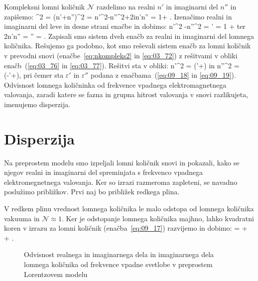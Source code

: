 Kompleksni lomni količnik $\mathcal{N}$ razdelimo na realni $n'$ in imaginarni del $n''$ in 
zapišemo:
\beq
{}^2 = (n'+n'')^2 = n'^2-n''^2+2in'n'' =  1+ .
\label{eq:09_17}
\eeq
Izenačimo realni in imaginarni del leve in desne strani enačbe in dobimo:
\beq
n'^2 -n''^2 = \varepsilon' = 1 + 
\label{eq:09_18}
\eeq
ter 
\beq
2n'n'' = \varepsilon'' = .
\label{eq:09_19}
\eeq
Zapisali smo sistem dveh enačb za realni in imaginarni del lomnega količnika. Rešujemo ga podobno, kot
smo reševali sistem enačb za lomni količnik v prevodni snovi (enačbe~\ref{eq:nkompleks2} in \ref{eq:03_72})
z rešitvami v obliki enačb~(\ref{eq:03_76} in \ref{eq:03_77}). Rešitvi sta v obliki:
\beq
n'^2 = \left(\varepsilon'+\right)
\label{eq:09_20}
\eeq
in
\beq
n''^2 = \left(-\varepsilon'+\right)\!,
\label{eq:09_21}
\eeq
pri čemer sta $\varepsilon'$ in $\varepsilon''$ podana z enačbama~(\ref{eq:09_18} in \ref{eq:09_19}).
Odvisnost lomnega količninka od frekvence vpadnega elektromagnetnega valovanja, zaradi katere
se fazna in grupna hitrost valovanja v snovi razlikujeta, imenujemo disperzija.

\section{Disperzija}
Na preprostem modelu smo izpeljali lomni količnik snovi in pokazali,
kako se njegov realni in imaginarni del
spreminjata s frekvenco vpadnega elektromegnetnega valovanja. Ker so izrazi
razmeroma zapleteni, se navadno poslužimo približkov. Prvi naj 
bo približek redkega plina. 

V redkem plinu vrednost lomnega količnika le malo odstopa od lomnega količnika vakuuma 
in $\mathcal{N} \approx 1$. Ker je odstopanje lomnega količnika majhno, lahko kvadratni koren v izrazu
za lomni količnik (enačba~\ref{eq:09_17}) razvijemo in dobimo:
\beq
{} =   +  + .
\label{eq:09_22}
\eeq
\begin{figure}[h!]
\centering
\def\svgwidth{100truemm} 
%
\caption{Odvisnost realnega in imaginarnega dela in imaginarnega dela lomnega količnika od frekvence
vpadne svetlobe v preprostem Lorentzovem modelu}
\label{fig:09_nkompelks}
\end{figure}


